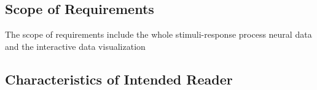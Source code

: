 \documentclass[12pt]{article}
\begin{document}

\subsection{Scope of Requirements}

The scope of requirements include the whole stimuli-response process neural data
and the interactive data visualization
%
%

\subsection{Characteristics of Intended Reader} \label{sec_IntendedReader}
\end{document}
